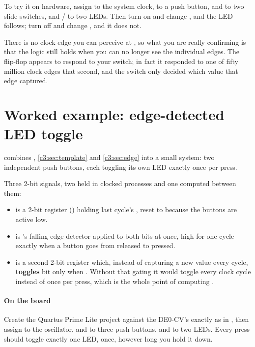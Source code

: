To try it on hardware, assign  to the  system clock,  to a
push button,  and  to two slide switches, and / to two LEDs.
Then turn  on and change , and the LED follows; turn  off and
change , and it does not.

There is no clock edge you can perceive at , so what you are really confirming is that
the logic still holds when you can no longer see the individual edges. The flip-flop appears to
respond to your switch; in fact it responded to one of fifty million clock edges that second, and
the switch only decided which value that edge captured.

\section{Worked example: edge-detected LED toggle}
\label{c3:sec:ledtoggle}

 combines , \ref{c3:sec:template} and
\ref{c3:sec:edge} into a small system: two independent push buttons, each toggling its own LED
exactly once per press.


Three 2-bit signals, two held in clocked processes and one computed between them:
\begin{itemize}
  \item {} is a 2-bit register () holding last cycle's
    , reset to  because the buttons are active low.
  \item {} is 's
    falling-edge detector applied to both bits at once, high for one cycle exactly when a button
    goes from released to pressed.
  \item {} is a second 2-bit register which, instead of capturing a new value every
    cycle, \textbf{toggles} bit  only when . Without that
    gating it would toggle every clock cycle instead of once per press, which is the whole point of
    computing .
\end{itemize}

\paragraph{On the board}
Create the Quartus Prime Lite project against the DE0-CV's  exactly as in
, then assign  to the  oscillator,  and
 to three push buttons, and  to two LEDs. Every
press should toggle exactly one LED, once, however long you hold it down.

